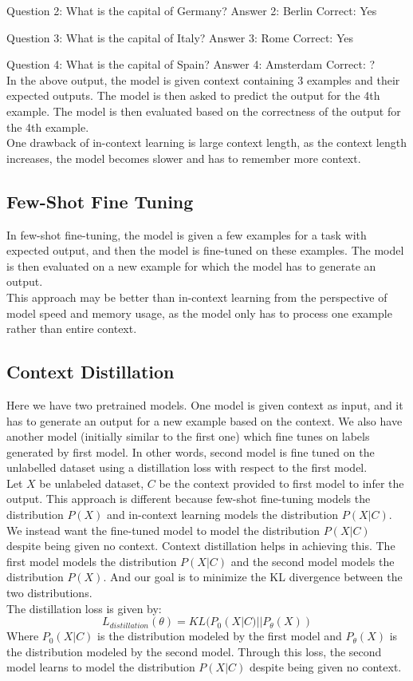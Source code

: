 \documentclass[10pt,twocolumn,letterpaper]{article}
\begin{document}
Question 2: What is the capital of Germany?
Answer 2: Berlin
Correct: Yes
    
Question 3: What is the capital of Italy?
Answer 3: Rome
Correct: Yes
    
Question 4: What is the capital of Spain?
Answer 4: Amsterdam
Correct: ?\\
In the above output, the model is given context containing 3 examples and their expected outputs. The model is then asked to predict the output for the 4th example. The model is then evaluated based on the correctness of the output for the 4th example. \\
One drawback of in-context learning is large context length, as the context length increases, the model becomes slower and has to remember more context.

\subsection{Few-Shot Fine Tuning}
In few-shot fine-tuning, the model is given a few examples for a task with expected output, and then the model is fine-tuned on these examples. The model is then evaluated on a new example for which the model has to generate an output. \\
This approach may be better than in-context learning from the perspective of model speed and memory usage, as the model only has to process one example rather than entire context.

\subsection{Context Distillation}
Here we have two pretrained models. One model is given context as input, and it has to generate an output for a new example based on the context.
We also have another model (initially similar to the first one) which fine tunes on labels generated by first model.
In other words, second model is fine tuned on the unlabelled dataset using a distillation loss with respect to the first model.\\
Let $X$ be unlabeled dataset, $C$ be the context provided to first model to infer the output. This approach is different because few-shot 
fine-tuning models the distribution $P(X)$ and in-context learning models the distribution $P(X|C)$.
We instead want the fine-tuned model to model the distribution $P(X|C)$ despite being given no context. Context distillation helps in achieving this.
The first model models the distribution $P(X|C)$ and the second model models the distribution $P(X)$.
And our goal is to minimize the KL divergence between the two distributions.\\
The distillation loss is given by:
\begin{equation}
	L_{distillation}(\theta) = KL(P_0(X|C) || P_{\theta}(X))
\end{equation}
Where $P_0(X|C)$ is the distribution modeled by the first model and $P_{\theta}(X)$ is the distribution modeled by the second model. Through this
loss, the second model learns to model the distribution $P(X|C)$ despite being given no context.
\end{document}
